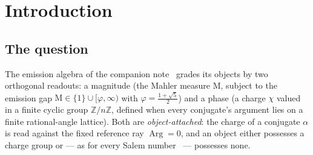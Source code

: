 \documentclass[11pt]{article}
\theoremstyle{plain}
\theoremstyle{definition}
\theoremstyle{remark}
\newcommand{\Z}{\mathbb{Z}}
\newcommand{\Mah}{\mathrm{M}}
\DeclareMathOperator{\Arg}{Arg}
\begin{document}
\begin{abstract}
among its conjugates off the real axis --- and no two of the canonical four
are circle-locked (circle-locked: a rational
phase difference links unit-circle conjugates \emph{across} the two objects);
each verdict is a complete per-instance decision, not a general theorem, and
whether \emph{any} Salem number carries nontrivial coherence remains open
(problem~P1). Last --- and conditionally on the companion note's emission
gap, the one hypothesis this note does not prove beyond degree two --- the
parity-graded Mahler floor is evaluated and becomes reference-free: the
parity bit is the order-$2$ element
$t_{\mathrm{rel}}(\varphi,\varphi')=\tfrac12$ carried internally by the
golden pair, not the ray $\pi$, and a sign-twist involution absorbs the new
anchor sector, so the relational floor equals the absolute one; that
identity, and the attainments, are unconditional --- only the floor's
numerical values rest on the gap. All
computational claims are verified in exact integer arithmetic and cross-checked
in a second computer-algebra stack; throughout, unconditional proofs, results
conditional on the emission gap, and per-instance computations are tagged
apart.
\end{abstract}

\section{Introduction}

\subsection{The question}

The emission algebra of the companion note~\cite{CMC} grades its objects by two
orthogonal readouts: a magnitude (the Mahler measure $\Mah$, subject to the
emission gap $\Mah\in\{1\}\cup[\varphi,\infty)$ with $\varphi=\frac{1+\sqrt5}{2}$)
and a phase (a charge $\chi$ valued in a finite cyclic group $\Z/n\Z$, defined when
every conjugate's argument lies on a finite rational-angle lattice). Both are
\emph{object-attached}: the charge of a conjugate $\alpha$ is read against the
fixed reference ray $\Arg=0$, and an object either possesses a charge group or ---
as for every Salem number~\cite{Salem,Bertin} --- possesses none.
\end{document}
